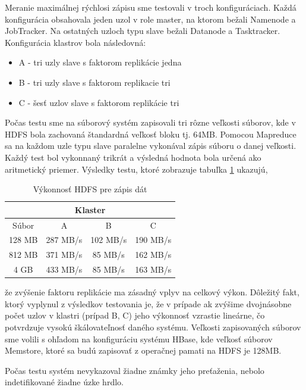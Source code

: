 \documentclass[11pt,twoside,a4paper]{book}
\begin{document}
Meranie maximálnej rýchlosi zápisu sme testovali v troch konfiguráciach. Každá konfigurácia obsahovala jeden uzol v role master, na ktorom bežali Namenode a JobTracker. Na ostatných uzloch typu slave bežali Datanode a Tasktracker. Konfigurácia klastrov bola následovná:

\begin{itemize}
 \item A - tri uzly slave s faktorom replikácie jedna
 \item B - tri uzly slave s faktorom replikacie tri
 \item C - šesť uzlov slave s faktorom replikácie tri
\end{itemize}

Počas testu sme na súborový systém zapisovali tri rôzne veľkosti súborov, kde v HDFS bola zachovaná štandardná veľkosť bloku tj. 64MB. Pomocou Mapreduce sa na každom uzle typu slave paralelne vykonával zápis súboru o danej veľkosti. Každý test bol vykonnaný trikrát a výsledná hodnota bola určená ako aritmetický priemer. Výsledky testu, ktoré zobrazuje tabuľka \ref{tab:HDFSperformance} ukazujú, 
\begin{table}[hp]
\begin{center}
\begin{tabular}{|c|c|c|c|}
\hline
\multicolumn{4}{|c|}{Klaster}  \\
\hline Súbor & A & B & C\\ 
\hline
\hline 128 MB & 287 MB/s& 102 MB/s& 190 MB/s\\ 
\hline 812 MB & 371 MB/s& 85 MB/s& 162 MB/s\\ 
\hline 4 GB & 433 MB/s& 85 MB/s& 163 MB/s\\ 
\hline
\end{tabular} 
\end{center}
\caption{Výkonnosť HDFS pre zápis dát}
\label{tab:HDFSperformance}
\end{table}
že zvýšenie faktoru replikácie ma zásadný vplyv na celkový výkon. Dôležitý fakt, ktorý vyplynul z výsledkov testovania je, že v prípade ak zvýšime dvojnásobne počet uzlov v klastri (prípad B, C) jeho výkonnosť vzrastie lineárne, čo potvrdzuje vysokú škálovateľnosť daného systému. Veľkosti zapisovaných súborov sme volili s ohľadom na konfiguráciu systému HBase, kde veľkosť súborov Memstore, ktoré sa budú zapisovať z operačnej pamati na HDFS je 128MB.

Počas testu systém nevykazoval žiadne známky jeho preťaženia, nebolo indetifikované žiadne úzke hrdlo.
\end{document}
